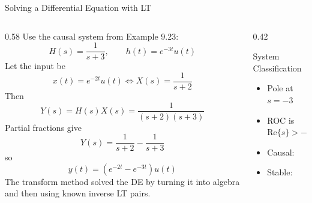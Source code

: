 \begin{frame}[t]{Solving a Differential Equation with LT}
  \small
  \begin{columns}[T]
    \begin{column}{0.58\textwidth}
      Use the causal system from Example 9.23:
      \[
        H(s)=\frac{1}{s+3},
        \qquad h(t)=e^{-3t}u(t)
      \]
      Let the input be
      \[
        x(t)=e^{-2t}u(t)
        \Longleftrightarrow
        X(s)=\frac{1}{s+2}
      \]
      Then
      \[
        Y(s)=H(s)X(s)=\frac{1}{(s+2)(s+3)}
      \]
      Partial fractions give
      \[
        Y(s)=\frac{1}{s+2}-\frac{1}{s+3}
      \]
      so
      \[
        y(t)=\left(e^{-2t}-e^{-3t}\right)u(t)
      \]
      The transform method solved the DE by turning it into algebra and then using known inverse LT pairs.
    \end{column}
    \begin{column}{0.42\textwidth}
      \begin{conceptbox}{System Classification}
        \begin{itemize}
          \item Pole at $s=-3$
          \item ROC is $\text{Re}\{s\}>-3$
          \item Causal: \cmark
          \item Stable: \cmark
        \end{itemize}
      \end{conceptbox}

      \vspace{0.15cm}
      \begin{center}
      \end{center}
    \end{column}
  \end{columns}
\end{frame}

